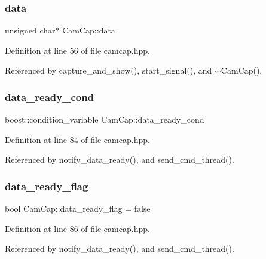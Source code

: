 \subsubsection{\texorpdfstring{data}{data}}
{\footnotesize\ttfamily unsigned char$\ast$ Cam\+Cap\+::data}



Definition at line 56 of file camcap.\+hpp.



Referenced by capture\+\_\+and\+\_\+show(), start\+\_\+signal(), and $\sim$\+Cam\+Cap().

\mbox{\label{class_cam_cap_a609ffa71782939a4428485a191202bbc}} 
\subsubsection{\texorpdfstring{data\+\_\+ready\+\_\+cond}{data\_ready\_cond}}
{\footnotesize\ttfamily boost\+::condition\+\_\+variable Cam\+Cap\+::data\+\_\+ready\+\_\+cond}



Definition at line 84 of file camcap.\+hpp.



Referenced by notify\+\_\+data\+\_\+ready(), and send\+\_\+cmd\+\_\+thread().

\mbox{\label{class_cam_cap_a6ebbdd1217a68d77959aec45c7ea59e2}} 
\subsubsection{\texorpdfstring{data\+\_\+ready\+\_\+flag}{data\_ready\_flag}}
{\footnotesize\ttfamily bool Cam\+Cap\+::data\+\_\+ready\+\_\+flag = false}



Definition at line 86 of file camcap.\+hpp.



Referenced by notify\+\_\+data\+\_\+ready(), and send\+\_\+cmd\+\_\+thread().

\mbox{\label{class_cam_cap_af1a617d50c6eed145fe96fd4b40e73bf}} 
